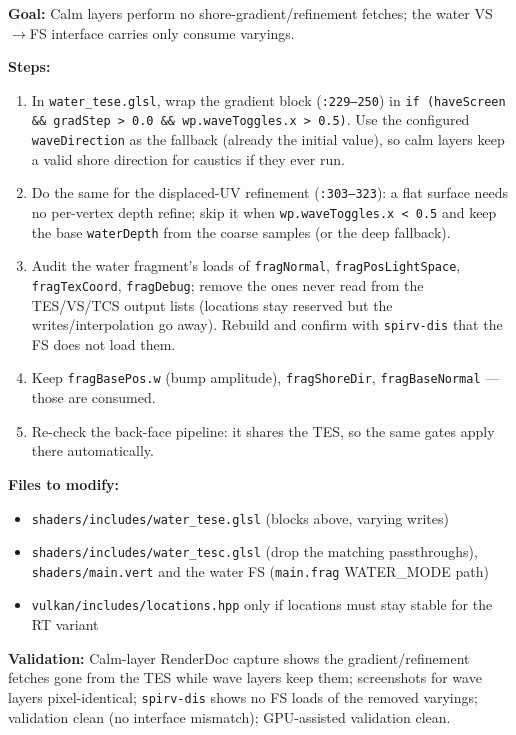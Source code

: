 \documentclass[11pt,a4paper]{article}
\begin{document}
\begin{tcolorbox}[promptbox={Prompt: Gate the TES Shore/Refinement Work on Waves and Prune Dead Varyings}]
\textbf{Goal:} Calm layers perform no shore-gradient/refinement fetches; the water VS$\to$FS interface carries only consume varyings.

\textbf{Steps:}
\begin{enumerate}
    \item In \texttt{water\_tese.glsl}, wrap the gradient block (\texttt{:229--250}) in \texttt{if (haveScreen \&\& gradStep > 0.0 \&\& wp.waveToggles.x > 0.5)}. Use the configured
    \texttt{waveDirection} as the fallback (already the initial value), so calm layers keep a valid shore direction for caustics if they ever run.
    \item Do the same for the displaced-UV refinement (\texttt{:303--323}): a flat surface needs no per-vertex depth refine; skip it when \texttt{wp.waveToggles.x < 0.5} and keep
    the base \texttt{waterDepth} from the coarse samples (or the deep fallback).
    \item Audit the water fragment's loads of \texttt{fragNormal}, \texttt{fragPosLightSpace}, \texttt{fragTexCoord}, \texttt{fragDebug}; remove the ones never read from the
    TES/VS/TCS output lists (locations stay reserved but the writes/interpolation go away). Rebuild and confirm with \texttt{spirv-dis} that the FS does not load them.
    \item Keep \texttt{fragBasePos.w} (bump amplitude), \texttt{fragShoreDir}, \texttt{fragBaseNormal} --- those are consumed.
    \item Re-check the back-face pipeline: it shares the TES, so the same gates apply there automatically.
\end{enumerate}

\textbf{Files to modify:}
\begin{itemize}
    \item \texttt{shaders/includes/water\_tese.glsl} (blocks above, varying writes)
    \item \texttt{shaders/includes/water\_tesc.glsl} (drop the matching passthroughs), \texttt{shaders/main.vert} and the water FS (\texttt{main.frag} WATER\_MODE path)
    \item \texttt{vulkan/includes/locations.hpp} only if locations must stay stable for the RT variant
\end{itemize}

\textbf{Validation:} Calm-layer RenderDoc capture shows the gradient/refinement fetches gone from the TES while wave layers keep them; screenshots for wave layers
pixel-identical; \texttt{spirv-dis} shows no FS loads of the removed varyings; validation clean (no interface mismatch); GPU-assisted validation clean.
\end{tcolorbox}
\end{document}
